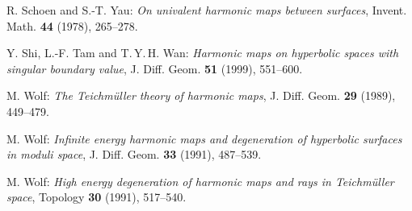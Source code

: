 \documentclass[12pt]{amsart}
\begin{document}
\begin{thebibliography}{99}
R. Schoen and S.-T. Yau:
\emph{On univalent harmonic maps between surfaces},
Invent. Math. \textbf{44} (1978), 265--278.

Y. Shi, L.-F. Tam and T.\,Y.\,H. Wan:
\emph{Harmonic maps on hyperbolic spaces with singular boundary
value}, J. Diff. Geom. \textbf{51} (1999), 551--600.

M. Wolf:
\emph{The Teichm\"{u}ller theory of harmonic maps},
J. Diff. Geom. \textbf{29} (1989), 449--479.

M. Wolf:
\emph{Infinite energy harmonic maps and degeneration of hyperbolic
surfaces in moduli space},
J. Diff. Geom. \textbf{33} (1991), 487--539.

M. Wolf:
\emph{High energy degeneration of harmonic maps and rays in
Teichm\"{u}ller space},
Topology \textbf{30} (1991), 517--540.

\end{thebibliography}

\vspace{20pt}

\address{
\noindent\textsc{Anestis Fotiadis}
\href{mailto:fotiadisanestis@math.auth.gr}
{fotiadisanestis@math.auth.gr}\\
Department of Mathematics, Aristotle University of Thessaloniki,\\
Thessaloniki 54124, Greece}

\vspace{10pt}

\address{
\noindent\textsc{Giannis Polychrou}
\href{mailto:polychrou.ioannis@ucy.ac.cy}
{polychrou.ioannis@ucy.ac.cy}\\
University of Cyprus, Department of Mathematics and Statistics,\\
Nicosia 1678, Cyprus}
\end{document}
